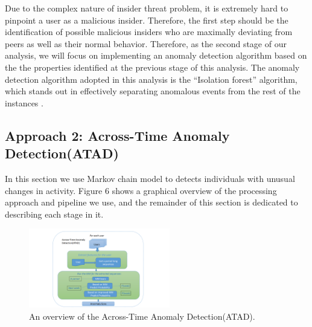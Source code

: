 \documentclass[conference]{IEEEtran}
\begin{document}
Due to the complex nature of insider threat problem, it is extremely hard to pinpoint a user as a malicious insider. Therefore, the first step should be the identification of possible malicious insiders who are maximally deviating from peers as well as their normal behavior. Therefore, as the second stage of our analysis, we will focus on implementing an anomaly detection algorithm based on the the  properties identified at the previous stage of this analysis. The anomaly detection algorithm adopted in this analysis is the “Isolation forest” algorithm, which stands out in effectively separating anomalous events from the rest of the instances \cite{b43}.

\subsection{Approach 2: Across-Time Anomaly Detection(ATAD)}

In this section we use Markov chain model \cite{b45} to detects individuals with unusual changes in activity. Figure 6 shows a graphical overview of the processing approach and pipeline we use, and the remainder of this section is dedicated to describing each stage in it.
\begin{figure}[htb]
\centerline{\includegraphics[width = 0.55\textwidth]{figure/figure6.png}}
\caption{An overview of the Across-Time Anomaly Detection(ATAD).}
\label{fig}
\end{figure}
\end{document}
